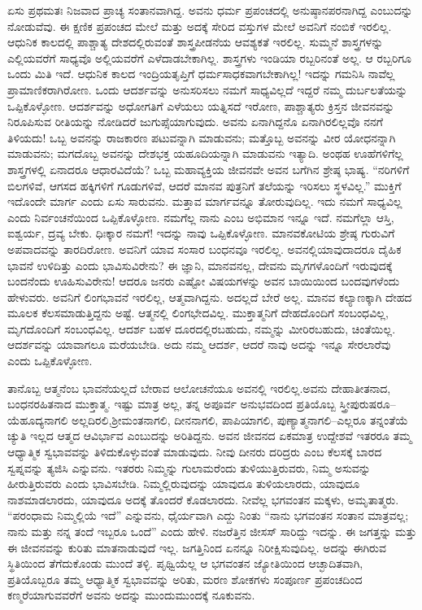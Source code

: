ಏಸು ಪ್ರಥಮತಃ ನಿಜವಾದ ಪ್ರಾಚ್ಯ ಸಂತಾನವಾಗಿದ್ದ. ಅವನು ಧರ್ಮ ಪ್ರಪಂಚದಲ್ಲಿ ಅನುಷ್ಠಾನಪರನಾಗಿದ್ದ ಎಂಬುದನ್ನು ನೋಡುವೆವು. ಈ ಕ್ಷಣಿಕ ಪ್ರಪಂಚದ ಮೇಲೆ ಮತ್ತು ಅದಕ್ಕೆ ಸೇರಿದ ವಸ್ತುಗಳ ಮೇಲೆ ಅವನಿಗೆ ನಂಬಿಕೆ ಇರಲಿಲ್ಲ. ಆಧುನಿಕ ಕಾಲದಲ್ಲಿ ಪಾಶ್ಚಾತ್ಯ ದೇಶದಲ್ಲಿರುವಂತೆ ಶಾಸ್ತ್ರಪೀಡನೆಯ ಆವಶ್ಯಕತೆ ಇರಲಿಲ್ಲ. ಸುಮ್ಮನೆ ಶಾಸ್ತ್ರಗಳನ್ನು ಎಲ್ಲಿಯವರೆಗೆ ಸಾಧ್ಯವೊ ಅಲ್ಲಿಯವರೆಗೆ ಎಳೆದಾಡಬೇಕಾಗಿಲ್ಲ. ಶಾಸ್ತ್ರಗಳು ಇಂಡಿಯಾ ರಬ್ಬರಿನಂತೆ ಅಲ್ಲ. ಆ ರಬ್ಬರಿಗೂ ಒಂದು ಮಿತಿ ಇದೆ. ಆಧುನಿಕ ಕಾಲದ ಇಂದ್ರಿಯತೃಪ್ತಿಗೆ ಧರ್ಮ\break ಸಾಧಕವಾಗಬೇಕಾಗಿಲ್ಲ! ಇದನ್ನು ಗಮನಿಸಿ ನಾವೆಲ್ಲ ಪ್ರಾಮಾಣಿಕರಾಗಿರೋಣ. ಒಂದು ಆದರ್ಶವನ್ನು ಅನುಸರಿಸಲು ನಮಗೆ ಸಾಧ್ಯವಿಲ್ಲದೆ ಇದ್ದರೆ ನಮ್ಮ ದುರ್ಬಲತೆಯನ್ನು ಒಪ್ಪಿಕೊಳ್ಳೋಣ. ಆದರ್ಶವನ್ನು ಅಧೋಗತಿಗೆ ಎಳೆಯಲು ಯತ್ನಿಸದೆ ಇರೋಣ, ಪಾಶ್ಚಾತ್ಯರು ಕ್ರಿಸ್ತನ ಜೀವನವನ್ನು ನಿರೂಪಿಸುವ ರೀತಿಯನ್ನು ನೋಡಿದರೆ ಜುಗುಪ್ಸೆಯಾಗುವುದು. ಅವನು ಏನಾಗಿದ್ದನೊ ಏನಾಗಿರಲಿಲ್ಲವೊ ನನಗೆ ತಿಳಿಯದು! ಒಬ್ಬ ಅವನನ್ನು ರಾಜಕಾರಣ ಪಟುವನ್ನಾಗಿ ಮಾಡುವನು; ಮತ್ತೊಬ್ಬ ಅವನನ್ನು ವೀರ ಯೋಧನನ್ನಾಗಿ ಮಾಡುವನು; ಮಗದೊಬ್ಬ ಅವನನ್ನು ದೇಶಭಕ್ತ ಯಹೂದಿಯನ್ನಾಗಿ ಮಾಡುವನು ಇತ್ಯಾದಿ. ಅಂಥಹ ಊಹೆಗಳಿಗೆಲ್ಲ ಶಾಸ್ತ್ರಗಳಲ್ಲಿ ಏನಾದರೂ ಆಧಾರವಿದೆಯೆ? ಒಬ್ಬ ಮಹಾವ್ಯಕ್ತಿಯ ಜೀವನವೇ ಅವನ ಬಗೆಗಿನ ಶ್ರೇಷ್ಠ ಭಾಷ್ಯ. “ನರಿಗಳಿಗೆ ಬಿಲಗಳಿವೆ, ಆಗಸದ ಹಕ್ಕಿಗಳಿಗೆ ಗೂಡುಗಳಿವೆ, ಆದರೆ ಮಾನವ ಪುತ್ರನಿಗೆ ತಲೆಯನ್ನು ಇರಿಸಲು ಸ್ಥಳವಿಲ್ಲ.” ಮುಕ್ತಿಗೆ ಇದೊಂದೇ ಮಾರ್ಗ ಎಂದು ಏಸು ಸಾರುವನು. ಮತ್ತಾವ ಮಾರ್ಗವನ್ನೂ ತೋರುವುದಿಲ್ಲ. ಇದು ನಮಗೆ ಸಾಧ್ಯವಿಲ್ಲ ಎಂದು ನಿರ್ವಂಚನೆಯಿಂದ ಒಪ್ಪಿಕೊಳ್ಳೋಣ. ನಮಗೆಲ್ಲ ನಾನು ಎಂಬ ಅಭಿಮಾನ ಇನ್ನೂ ಇದೆ. ನಮಗೆಲ್ಲಾ ಆಸ್ತಿ, ಐಶ್ವರ್ಯ, ದ್ರವ್ಯ ಬೇಕು. ಧಿಃಕ್ಕಾರ ನಮಗೆ! ಇದನ್ನು ನಾವು ಒಪ್ಪಿಕೊಳ್ಳೋಣ. ಮಾನವಕೋಟಿಯ ಶ್ರೇಷ್ಠ ಗುರುವಿಗೆ ಅಪವಾದ\break ವನ್ನು ತಾರದಿರೋಣ. ಅವನಿಗೆ ಯಾವ ಸಂಸಾರ ಬಂಧನವೂ ಇರಲಿಲ್ಲ. ಅವನಲ್ಲಿ\break ಯಾವುದಾದರೂ ದೈಹಿಕ ಭಾವನೆ ಉಳಿದಿತ್ತು ಎಂದು ಭಾವಿಸುವಿರೇನು? ಈ ಜ್ಞಾನಿ, ಮಾನವನಲ್ಲ, ದೇವನು ಮೃಗಗಳೊಂದಿಗೆ ಇರುವುದಕ್ಕೆ ಬಂದನೆಂದು ಊಹಿಸುವಿರೇನು! ಆದರೂ ಜನರು ಎಷ್ಟೋ ವಿಷಯಗಳನ್ನು ಅವನ ಬಾಯಿಯಿಂದ ಬಂದವುಗಳೆಂದು ಹೇಳುವರು. ಅವನಿಗೆ ಲಿಂಗಭಾವನೆ ಇರಲಿಲ್ಲ, ಆತ್ಮವಾಗಿದ್ದನು. ಅದಲ್ಲದೆ ಬೇರೆ ಅಲ್ಲ. ಮಾನವ ಕಲ್ಯಾಣಕ್ಕಾಗಿ ದೇಹದ ಮೂಲಕ ಕೆಲಸಮಾಡುತ್ತಿದ್ದನು ಅಷ್ಟೆ. ಆತ್ಮನಲ್ಲಿ ಲಿಂಗಭೇದವಿಲ್ಲ. ಮುಕ್ತಾತ್ಮನಿಗೆ ದೇಹದೊಂದಿಗೆ ಸಂಬಂಧವಿಲ್ಲ, ಮೃಗದೊಂದಿಗೆ ಸಂಬಂಧವಿಲ್ಲ. ಆದರ್ಶ ಬಹಳ ದೂರ\-ದಲ್ಲಿರಬಹುದು, ನಮ್ಮನ್ನು ಮೀರಿರಬಹುದು, ಚಿಂತೆಯಿಲ್ಲ. ಆದರ್ಶವನ್ನು ಯಾವಾಗಲೂ ಮರೆಯಬೇಡಿ. ಅದು ನಮ್ಮ ಆದರ್ಶ, ಆದರೆ ನಾವು ಅದನ್ನು ಇನ್ನೂ ಸೇರಲಾರೆವು ಎಂದು ಒಪ್ಪಿಕೊಳ್ಳೋಣ.

ತಾನೊಬ್ಬ ಆತ್ಮನೆಂಬ ಭಾವನೆಯಲ್ಲದೆ ಬೇರಾವ ಆಲೋಚನೆಯೂ ಅವನಲ್ಲಿ ಇರಲಿಲ್ಲ.\break ಅವನು ದೇಹಾತೀತನಾದ, ಬಂಧನರಹಿತನಾದ ಮುಕ್ತಾತ್ಮ. ಇಷ್ಟು ಮಾತ್ರ ಅಲ್ಲ, ತನ್ನ ಅಪೂರ್ವ ಅನುಭವದಿಂದ ಪ್ರತಿಯೊಬ್ಬ ಸ್ತ್ರೀಪುರುಷರೂ– ಯೆಹೂದ್ಯನಾಗಲಿ ಅಲ್ಲದಿರಲಿ,\break ಶ‍್ರೀಮಂತನಾಗಲಿ, ದೀನನಾಗಲಿ, ಪಾಪಿಯಾಗಲಿ, ಪುಣ್ಯಾತ್ಮನಾಗಲಿ–ಎಲ್ಲರೂ ತನ್ನಂತೆಯೆ ಚ್ಯುತಿ ಇಲ್ಲದ ಆತ್ಮದ ಆವಿರ್ಭಾವ ಎಂಬುದನ್ನು ಅರಿತಿದ್ದನು. ಅವನ ಜೀವನದ ಏಕಮಾತ್ರ ಉದ್ದೇಶವೆ ಇತರರೂ ತಮ್ಮ ಆಧ್ಯಾತ್ಮಿಕ ಸ್ವಭಾವವನ್ನು ತಿಳಿದುಕೊಳ್ಳುವಂತೆ ಮಾಡುವುದು. ನೀವು ದೀನರು ದರಿದ್ರರು ಎಂಬ ಕೆಲಸಕ್ಕೆ ಬಾರದ ಸ್ವಪ್ನವನ್ನು ತ್ಯಜಿಸಿ ಎನ್ನುವನು. ಇತರರು ನಿಮ್ಮನ್ನು ಗುಲಾಮರೆಂದು ತುಳಿಯುತ್ತಿರುವರು, ನಿಮ್ಮ ಅಸುವನ್ನು ಹೀರುತ್ತಿರುವರು ಎಂದು ಭಾವಿಸಬೇಡಿ. ನಿಮ್ಮಲ್ಲಿರುವುದನ್ನು ಯಾವುದೂ ತುಳಿಯಲಾರದು, ಯಾವುದೂ ನಾಶಮಾಡಲಾರದು, ಯಾವುದೂ ಅದಕ್ಕೆ ತೊಂದರೆ ಕೊಡಲಾರದು. ನೀವೆಲ್ಲ ಭಗವಂತನ ಮಕ್ಕಳು, ಅಮೃತಾತ್ಮರು. “ಪರಂಧಾಮ ನಿಮ್ಮಲ್ಲಿಯೆ ಇದೆ” ಎನ್ನುವನು, ಧೈರ್ಯವಾಗಿ ಎದ್ದು ನಿಂತು “ನಾನು ಭಗವಂತನ ಸಂತಾನ ಮಾತ್ರವಲ್ಲ; ನಾನು ಮತ್ತು ನನ್ನ ತಂದೆ ಇಬ್ಬರೂ ಒಂದೆ” ಎಂದು ಹೇಳಿ. ನಜರೆತ್ತಿನ ಜೀಸಸ್​ ಸಾರಿದ್ದು ಇದನ್ನು. ಈ ಜಗತ್ತನ್ನು ಮತ್ತು ಈ ಜೀವನವನ್ನು ಕುರಿತು ಮಾತನಾಡುವುದೆ ಇಲ್ಲ. ಜಗತ್ತಿನಿಂದ ಏನನ್ನೂ ನಿರೀಕ್ಷಿಸುವುದಿಲ್ಲ. ಅದನ್ನು ಈಗಿರುವ ಸ್ಥಿತಿಯಿಂದ ತೆಗೆದುಕೊಂಡು ಮುಂದೆ ತಳ್ಳಿ. ಪೃಥ್ವಿಯೆಲ್ಲ ಆ ಭಗವಂತನ ಜ್ಯೋತಿಯಿಂದ ಆಚ್ಛಾದಿತವಾಗಿ, ಪ್ರತಿಯೊಬ್ಬರೂ ತಮ್ಮ ಆಧ್ಯಾತ್ಮಿಕ ಸ್ವಭಾವವನ್ನು ಅರಿತು, ಮರಣ ಶೋಕಗಳು ಸಂಪೂರ್ಣ ಪ್ರಪಂಚದಿಂದ ಕಣ್ಮರೆಯಾಗುವವರೆಗೆ ಅವನು ಅದನ್ನು ಮುಂದುಮುಂದಕ್ಕೆ ನೂಕುವನು.

